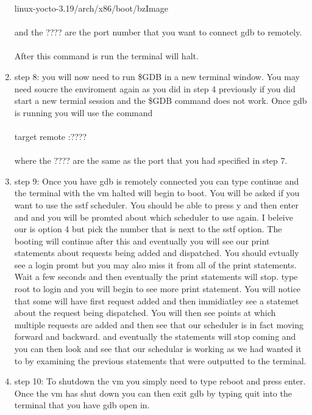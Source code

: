 \documentclass[letterpaper,10pt,titlepage]{article}
\begin{document}
\begin{enumerate}
   linux-yocto-3.19/arch/x86/boot/bzImage\\\\
   and the ???? are the port number that you want to connect gdb to remotely.\\\\
   After this command is run the terminal will halt.
\item{step 8: }
   you will now need to run \$GDB in a new terminal window. You may need soucre 
   the enviroment again as you did in step 4 previously if you did start a new 
   termial session and the \$GDB command does not work. Once gdb is running you 
   will use the command\\\\
   target remote :????\\\\
   where the ???? are the same as the port that you had specified in step 7.
\item{step 9: }
   Once you have gdb is remotely connected you can type continue and the terminal 
   with the vm halted will begin to boot. You will be asked if you want to use the 
   sstf scheduler. You should be able to press y and then enter and and you will 
   be promted about which scheduler to use again. I beleive our is option 4 but 
   pick the number that is next to the sstf option. The booting will continue 
   after this and eventually you will see our print statements about requests being 
   added and dispatched. You should evtually see a login promt but you may also miss 
   it from all of the print statements. Wait a few seconds and then eventually the 
   print statements will stop. type root to login and you will begin to see more 
   print statement. You will notice that some will have first request added and 
   then immidiatley see a statemet about the request being dispatched. You will 
   then see points at which multiple requests are added and then see that our 
   scheduler is in fact moving forward and backward. and eventually the statements 
   will stop coming and you can then look and see that our schedular is working as 
   we had wanted it to by examining the previous statements that were outputted to 
   the terminal.
\item{step 10: }
   To shutdown the vm you simply need to type reboot and press enter. Once the 
   vm has shut down you can then exit gdb by typing quit into the terminal that 
   you have gdb open in.
   
\end{enumerate}
\end{document}
